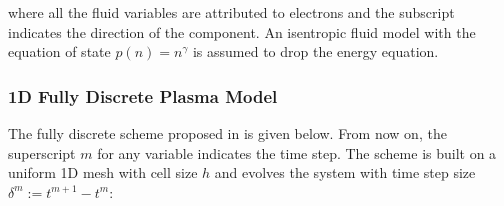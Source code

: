 \documentclass{article}
\begin{document}
where all the fluid variables are attributed to electrons and the subscript indicates the
direction of the component. An isentropic fluid model with the equation of state
$p(n) = n^\gamma$ is assumed to drop the energy equation.

\subsubsection{1D Fully Discrete Plasma Model}
\label{sec:1d_fully_discrete_model}

The fully discrete scheme proposed in \cite{degond_2012} is given below. From now on, the
superscript $m$ for any variable indicates the time step. The scheme is built on a uniform
1D mesh with cell size $h$ and evolves the system with time step size
$\delta^m := t^{m+1} - t^m$:
\end{document}
